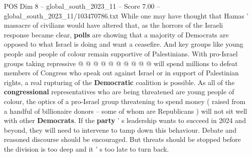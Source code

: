 \begin{textsample}{POS Dim 8 – global\_south\_2023\_11 – Score 7.00 – global\_south\_2023\_11/103470786.txt}
While one may have thought that Hamas ' massacre of civilians would have altered that, as the horrors of the Israeli response became clear, \textbf{polls} are showing that a majority of Democrats are opposed to what Israel is doing and want a ceasefire.
And key groups like young people and people of colour remain supportive of Palestinians.
With pro-Israel groups taking repressive @ @ @ @ @ @ @ @ @ @ will spend millions to defeat members of Congress who speak out against Israel or in support of Palestinian rights, a real rupturing of the \textbf{Democratic} coalition is possible.
As all of the \textbf{congressional} representatives who are being threatened are young people of colour, the optics of a pro-Israel group threatening to spend money ( raised from a handful of billionaire donors -- some of whom are Republicans ) will not sit well with other \textbf{Democrats}.
If the \textbf{party} ' s leadership wants to succeed in 2024 and beyond, they will need to intervene to tamp down this behaviour.
Debate and reasoned discourse should be encouraged.
But threats should be stopped before the division is too deep and it ' s too late to turn back.

\end{textsample}
